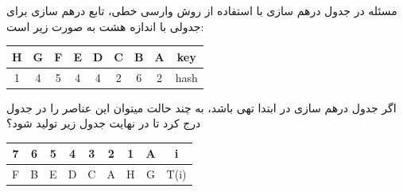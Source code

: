 ‌مسئله
در جدول درهم سازی با استفاده از روش وارسی خطی، تابع درهم سازی برای جدولی با اندازه هشت به صورت زیر است:


\begin{center}
	\begin{tabular}{|c|c|c|c|c|c|c|c|c| }
		\hline
		H & G & F & E & D & C & B & A & key\\ \hline
		1 & 4 & 5 & 4 & 4 & 2 & 6 & 2 & hash \\
		\hline
	\end{tabular}
\end{center}

اگر جدول درهم سازی در ابتدا تهی باشد، به چند حالت میتوان این عناصر را در جدول درج کرد تا در نهایت جدول زیر تولید شود؟

\begin{center}
	\begin{tabular}{|c|c|c|c|c|c|c|c|c| }
		\hline
		7 & 6 & 5 & 4 & 3 & 2 & 1 & A & i\\ \hline
		F & B & E & D & C & A & H & G & T(i) \\
		\hline
	\end{tabular}
\end{center}


